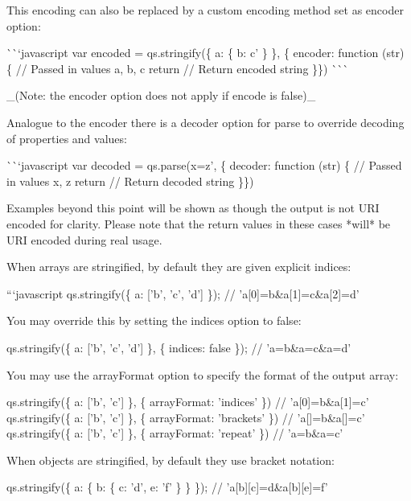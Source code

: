 This encoding can also be replaced by a custom encoding method set as {\ttfamily encoder} option\+:

\`{}\`{}`javascript var encoded = qs.\+stringify(\{ a\+: \{ b\+: \textquotesingle{}c' \} \}, \{ encoder\+: function (str) \{ // Passed in values {\ttfamily a}, {\ttfamily b}, {\ttfamily c} return // Return encoded string \}\}) \`{}\`{}\`{}

\+\_\+(Note\+: the {\ttfamily encoder} option does not apply if {\ttfamily encode} is {\ttfamily false})\+\_\+

Analogue to the {\ttfamily encoder} there is a {\ttfamily decoder} option for {\ttfamily parse} to override decoding of properties and values\+:

\`{}\`{}`javascript var decoded = qs.\+parse(\textquotesingle{}x=z', \{ decoder\+: function (str) \{ // Passed in values {\ttfamily x}, {\ttfamily z} return // Return decoded string \}\}) 
\begin{DoxyCode}
Examples beyond this point will be shown as though the output is not URI encoded for clarity. Please note
       that the return values in these cases *will* be URI encoded during real usage.

When arrays are stringified, by default they are given explicit indices:

```javascript
qs.stringify(\{ a: ['b', 'c', 'd'] \});
// 'a[0]=b&a[1]=c&a[2]=d'
\end{DoxyCode}


You may override this by setting the {\ttfamily indices} option to {\ttfamily false}\+:


\begin{DoxyCode}
qs.stringify(\{ a: ['b', 'c', 'd'] \}, \{ indices: false \});
// 'a=b&a=c&a=d'
\end{DoxyCode}


You may use the {\ttfamily array\+Format} option to specify the format of the output array\+:


\begin{DoxyCode}
qs.stringify(\{ a: ['b', 'c'] \}, \{ arrayFormat: 'indices' \})
// 'a[0]=b&a[1]=c'
qs.stringify(\{ a: ['b', 'c'] \}, \{ arrayFormat: 'brackets' \})
// 'a[]=b&a[]=c'
qs.stringify(\{ a: ['b', 'c'] \}, \{ arrayFormat: 'repeat' \})
// 'a=b&a=c'
\end{DoxyCode}


When objects are stringified, by default they use bracket notation\+:


\begin{DoxyCode}
qs.stringify(\{ a: \{ b: \{ c: 'd', e: 'f' \} \} \});
// 'a[b][c]=d&a[b][e]=f'
\end{DoxyCode}


